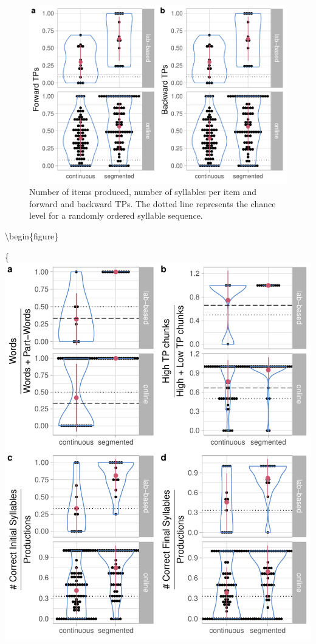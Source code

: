 \documentclass[
]{article}
\begin{document}
\begin{figure}

{\centering \includegraphics[width=0.8\linewidth]{segmentation_recall_combined_for_revision_files/figure-latex/recall-general-measures-tp-plot-tps-1} 

}

\caption{Number of items produced, number of syllables per item and forward and backward TPs. The dotted line represents the chance level for a randomly ordered syllable sequence.}\label{fig:recall-general-measures-tp-plot-tps}
\end{figure}

\textbackslash begin\{figure\}

\{\centering \includegraphics[width=0.8\linewidth]{segmentation_recall_combined_for_revision_files/figure-latex/recall-w-pw-chunks-positions-plot-1}
\end{document}
